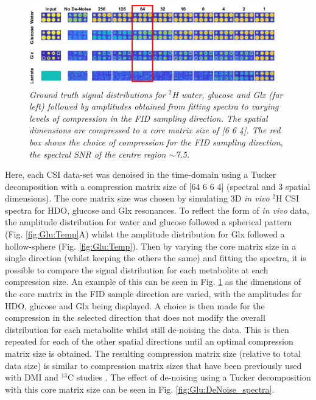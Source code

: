 \begin{figure}
   \centering
   \includegraphics[width = 0.95\textwidth]{Figures/Glucose/DeNoise_Sim.png}
   \caption{\textit{Ground truth signal distributions for $^2$H water, glucose and Glx (far left) followed by amplitudes obtained from fitting spectra to varying levels of compression in the \ac{FID} sampling direction. The spatial dimensions are compressed to a core matrix size of [6 6 4]. The red box shows the choice of compression for the FID sampling direction, the spectral \ac{SNR} of the centre region $\sim$7.5.}}
   \label{fig:Glu:DeNoise}
\end{figure}

Here, each \ac{CSI} data-set was denoised in the time-domain using a Tucker decomposition \cite{Bader2007EfficientTensors} with a compression matrix size of [64 6 6 4] (spectral and 3 spatial dimensions). The core matrix size was chosen by simulating 3D \textit{in vivo} $^2$H \ac{CSI} spectra for HDO, glucose and Glx resonances. To reflect the form of \textit{in vivo} data, the amplitude distribution for water and glucose followed a spherical pattern (Fig. \ref{fig:Glu:Temp}A) whilst the amplitude distribution for Glx followed a hollow-sphere (Fig. \ref{fig:Glu:Temp}). Then by varying the core matrix size in a single direction (whilst keeping the others the same) and fitting the spectra, it is possible to compare the signal distribution for each metabolite at each compression size. An example of this can be seen in Fig. \ref{fig:Glu:DeNoise} as the dimensions of the core matrix in the FID sample direction are varied, with the amplitudes for HDO, glucose and Glx being displayed. A choice is then made for the compression in the selected direction that does not modify the overall distribution for each metabolite whilst still de-noising the data. This is then repeated for each of the other spatial directions until an optimal compression matrix size is obtained. The resulting compression matrix size (relative to total data size) is similar to compression matrix sizes that have been previously used with \ac{DMI} \cite{vonMorze2021ComparisonT, Kreis2020MeasuringMRI} and $^{13}$C studies \cite{Brender2019DynamicHyperpolarization}. The effect of de-noising using a Tucker decomposition with this core matrix size can be seen in Fig. \ref{fig:Glu:DeNoise_spectra}.

